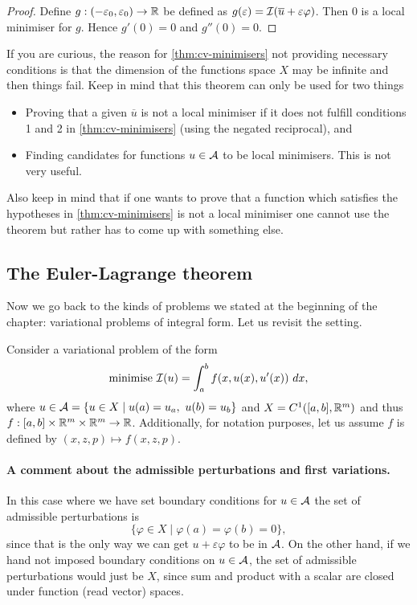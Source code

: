\begin{proof}
  Define $g: (-\varepsilon_0, \varepsilon_0) \to \mathbb{R}$ be defined as
  $g(\varepsilon) = \mathcal{I}(\overline{u} + \varepsilon \varphi)$. Then $0$ is a
  local minimiser for $g$. Hence $g'(0) = 0$ and $g''(0) = 0$.
\end{proof}

If you are curious, the reason for \autoref{thm:cv-minimisers} not providing
necessary conditions is that the dimension of the functions space $X$ may be
infinite and then things fail. Keep in mind that this theorem can only be used for two things
\begin{itemize}
  \item Proving that a given $\overline{u}$ is not a local minimiser if it does
    not fulfill conditions 1 and 2 in \autoref{thm:cv-minimisers} (using the
    negated reciprocal), and
  \item Finding candidates for functions $u \in \mathcal{A}$ to be local minimisers.
    This is not very useful.
\end{itemize}
Also keep in mind that if one wants to prove that a function which satisfies
the hypotheses in \autoref{thm:cv-minimisers} is not a local minimiser one
cannot use the theorem but rather has to come up with something else.

\subsection{The Euler-Lagrange theorem}

Now we go back to the kinds of problems we stated at the beginning of the
chapter: variational problems of integral form. Let us revisit the setting.

Consider a variational problem of the form
\begin{equation}
  \label{eq:cv-integral-2}
  \text{minimise } \mathcal{I}(u) = \int_a^b f(x, u(x), u'(x))\ dx,
\end{equation}
where $u \in \mathcal{A} = \{u \in X \mid u(a) = u_a,\ u(b) = u_b\}$ and $X = C^1([a,
b], \mathbb{R}^m)$ and thus $f : [a, b] \times \mathbb{R}^m \times \mathbb{R}^m \to \mathbb{R}$.  Additionally,
for notation purposes, let us assume $f$ is defined by $(x, z, p) \mapsto f(x,
z, p)$.

\paragraph{A comment about the admissible perturbations and first variations.}
In this case where we have set boundary conditions for $u \in \mathcal{A}$ the set of
admissible perturbations is
\[
  \{ \varphi \in X \mid \varphi(a) = \varphi(b) = 0\},
\]
since that is the only way we can get $u + \varepsilon \varphi$ to be in
$\mathcal{A}$. On the other hand, if we hand not imposed boundary conditions on $u
\in \mathcal{A}$, the set of admissible perturbations would just be $X$, since sum
and product with a scalar are closed under function (read vector) spaces.


